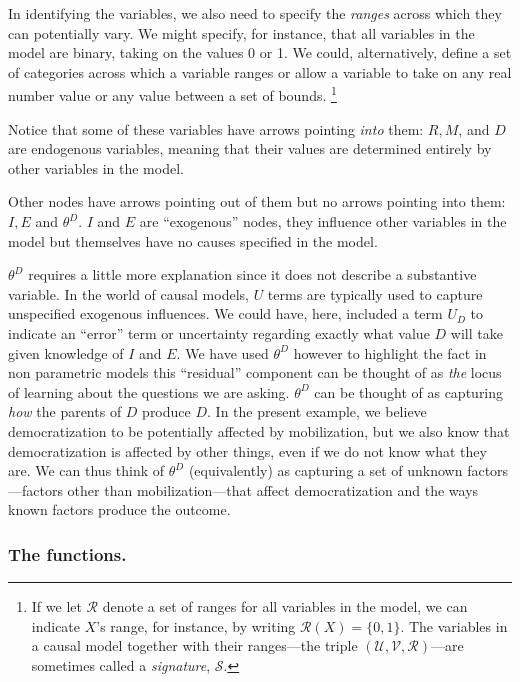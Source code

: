 \documentclass[
  12pt,
]{book}
\begin{document}
In identifying the variables, we also need to specify the \emph{ranges} across which they can potentially vary. We might specify, for instance, that all variables in the model are binary, taking on the values 0 or 1. We could, alternatively, define a set of categories across which a variable ranges or allow a variable to take on any real number value or any value between a set of bounds. \footnote{If we let \(\mathcal{R}\) denote a set of ranges for all variables in the model, we can indicate \(X\)'s range, for instance, by writing \(\mathcal{R}(X)=\{0,1\}\). The variables in a causal model together with their ranges---the triple \((\mathcal{U}, \mathcal{V}, \mathcal{R})\)---are sometimes called a \emph{signature}, \(\mathcal{S}\).}

Notice that some of these variables have arrows pointing \emph{into} them: \(R, M\), and \(D\) are endogenous variables, meaning that their values are determined entirely by other variables in the model.

Other nodes have arrows pointing out of them but no arrows pointing into them: \(I, E\) and \(\theta^D\). \(I\) and \(E\) are ``exogenous'' nodes, they influence other variables in the model but themselves have no causes specified in the model.

\(\theta^D\) requires a little more explanation since it does not describe a substantive variable. In the world of causal models, \(U\) terms are typically used to capture unspecified exogenous influences. We could have, here, included a term \(U_D\) to indicate an ``error'' term or uncertainty regarding exactly what value \(D\) will take given knowledge of \(I\) and \(E\). We have used \(\theta^D\) however to highlight the fact in non parametric models this ``residual'' component can be thought of as \emph{the} locus of learning about the questions we are asking. \(\theta^D\) can be thought of as capturing \emph{how} the parents of \(D\) produce \(D\). In the present example, we believe democratization to be potentially affected by mobilization, but we also know that democratization is affected by other things, even if we do not know what they are. We can thus think of \(\theta^D\) (equivalently) as capturing a set of unknown factors---factors other than mobilization---that affect democratization and the ways known factors produce the outcome.

\hypertarget{the-functions.}{%
\subsubsection{The functions.}\label{the-functions.}}
\end{document}
